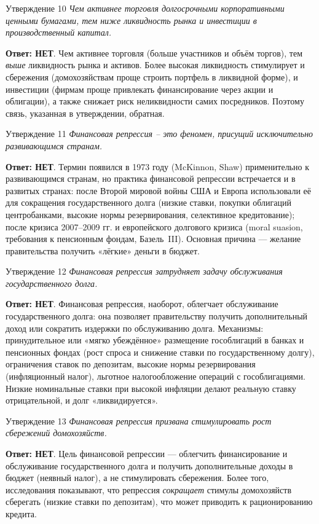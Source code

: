 \documentclass[10pt,a4paper]{article}
\newcommand{\qnet}{\textbf{\color{nored}Ответ: НЕТ}}
\newenvironment{answer}[2]{%
  \begin{qbox}{Утверждение #1}
  \textit{#2}\par\smallskip
}{%
  \end{qbox}\vspace{2pt}
}
\begin{document}
\begin{answer}{10}{Чем активнее торговля долгосрочными корпоративными ценными бумагами, тем ниже ликвидность рынка и инвестиции в производственный капитал.}
\qnet. Чем активнее торговля (больше участников и объём торгов), тем \emph{выше} ликвидность рынка и активов. Более высокая ликвидность стимулирует и сбережения (домохозяйствам проще строить портфель в ликвидной форме), и инвестиции (фирмам проще привлекать финансирование через акции и облигации), а также снижает риск неликвидности самих посредников. Поэтому связь, указанная в утверждении, обратная.
\end{answer}

\begin{answer}{11}{Финансовая репрессия -- это феномен, присущий исключительно развивающимся странам.}
\qnet. Термин появился в 1973 году (McKinnon, Shaw) применительно к развивающимся странам, но практика финансовой репрессии встречается и в развитых странах: после Второй мировой войны США и Европа использовали её для сокращения государственного долга (низкие ставки, покупки облигаций центробанками, высокие нормы резервирования, селективное кредитование); после кризиса 2007--2009 гг. и европейского долгового кризиса (moral suasion, требования к пенсионным фондам, Базель~III). Основная причина --- желание правительства получить «лёгкие» деньги в бюджет.
\end{answer}

\begin{answer}{12}{Финансовая репрессия затрудняет задачу обслуживания государственного долга.}
\qnet. Финансовая репрессия, наоборот, облегчает обслуживание государственного долга: она позволяет правительству получить дополнительный доход или сократить издержки по обслуживанию долга. Механизмы: принудительное или «мягко убеждённое» размещение гособлигаций в банках и пенсионных фондах (рост спроса и снижение ставки по государственному долгу), ограничения ставок по депозитам, высокие нормы резервирования (инфляционный налог), льготное налогообложение операций с гособлигациями. Низкие номинальные ставки при высокой инфляции делают реальную ставку отрицательной, и долг «ликвидируется».
\end{answer}

\begin{answer}{13}{Финансовая репрессия призвана стимулировать рост сбережений домохозяйств.}
\qnet. Цель финансовой репрессии --- облегчить финансирование и обслуживание государственного долга и получить дополнительные доходы в бюджет (неявный налог), а не стимулировать сбережения. Более того, исследования показывают, что репрессия \emph{сокращает} стимулы домохозяйств сберегать (низкие ставки по депозитам), что может приводить к рационированию кредита.
\end{answer}
\end{document}
